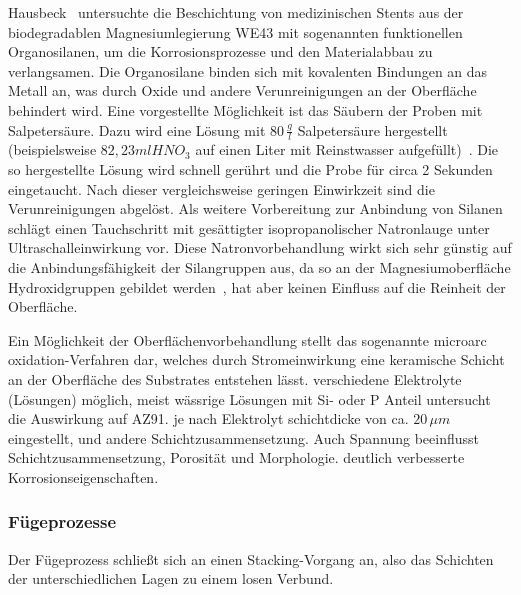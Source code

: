 Hausbeck~\cite{Hausbeck.2012} untersuchte die Beschichtung von medizinischen Stents aus der biodegradablen Magnesiumlegierung WE43 mit sogenannten funktionellen Organosilanen, um die Korrosionsprozesse und den Materialabbau zu verlangsamen.
Die Organosilane binden sich mit kovalenten Bindungen an das Metall an, was durch Oxide und andere Verunreinigungen an der Oberfläche behindert wird.
Eine vorgestellte Möglichkeit ist das Säubern der Proben mit Salpetersäure.
Dazu wird eine Lösung mit $80\, \frac{g}{l}$ Salpetersäure hergestellt (beispielsweise $82,23 ml HNO_3$ auf einen Liter mit Reinstwasser aufgefüllt)~.
Die so hergestellte Lösung wird schnell gerührt und die Probe für circa 2 Sekunden eingetaucht.
Nach dieser vergleichsweise geringen Einwirkzeit sind die Verunreinigungen abgelöst.
Als weitere Vorbereitung zur Anbindung von Silanen schlägt \cite{Hausbeck.2012} einen Tauchschritt mit gesättigter isopropanolischer Natronlauge unter Ultraschalleinwirkung vor.
Diese Natronvorbehandlung wirkt sich sehr günstig auf die Anbindungsfähigkeit der Silangruppen aus, da so an der Magnesiumoberfläche Hydroxidgruppen gebildet werden~\cite{Hausbeck.2012,Gou.2004}, hat aber keinen Einfluss auf die Reinheit der Oberfläche.

Ein Möglichkeit der Oberflächenvorbehandlung stellt das sogenannte microarc oxidation-Verfahren dar, welches durch Stromeinwirkung eine keramische Schicht an der Oberfläche des Substrates entstehen lässt.
verschiedene Elektrolyte (Lösungen) möglich, meist wässrige Lösungen mit Si- oder P Anteil
\cite{Cai.2006} untersucht die Auswirkung auf AZ91.
je nach Elektrolyt schichtdicke von ca. $20 \, \mu m$ eingestellt, und andere Schichtzusammensetzung.
Auch Spannung beeinflusst Schichtzusammensetzung, Porosität und Morphologie.
deutlich verbesserte Korrosionseigenschaften.

\subsubsection{Fügeprozesse}

Der Fügeprozess schließt sich an einen Stacking-Vorgang an, also das Schichten der unterschiedlichen Lagen zu einem losen Verbund.

